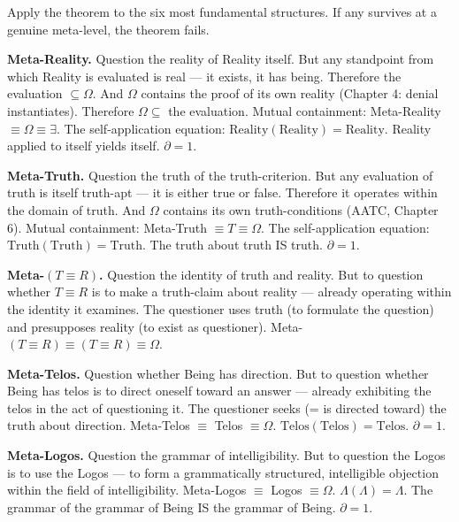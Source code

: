 \documentclass[10pt, openany, oneside]{book}
\begin{document}
\vspace{1em}

\noindent Apply the theorem to the six most fundamental structures. If any survives at a genuine meta-level, the theorem fails.

\textbf{Meta-Reality.} Question the reality of Reality itself. But any standpoint from which Reality is evaluated is real --- it exists, it has being. Therefore the evaluation $\subseteq \Omega$. And $\Omega$ contains the proof of its own reality (Chapter 4: denial instantiates). Therefore $\Omega \subseteq$ the evaluation. Mutual containment: Meta-Reality $\equiv \Omega \equiv \exists$. The self-application equation: $\text{Reality}(\text{Reality}) = \text{Reality}$. Reality applied to itself yields itself. $\partial = 1$.

\textbf{Meta-Truth.} Question the truth of the truth-criterion. But any evaluation of truth is itself truth-apt --- it is either true or false. Therefore it operates within the domain of truth. And $\Omega$ contains its own truth-conditions (AATC, Chapter 6). Mutual containment: Meta-Truth $\equiv T \equiv \Omega$. The self-application equation: $\text{Truth}(\text{Truth}) = \text{Truth}$. The truth about truth IS truth. $\partial = 1$.

\textbf{Meta-$(T \equiv R)$.} Question the identity of truth and reality. But to question whether $T \equiv R$ is to make a truth-claim about reality --- already operating within the identity it examines. The questioner uses truth (to formulate the question) and presupposes reality (to exist as questioner). Meta-$(T \equiv R) \equiv (T \equiv R) \equiv \Omega$.

\textbf{Meta-Telos.} Question whether Being has direction. But to question whether Being has telos is to direct oneself toward an answer --- already exhibiting the telos in the act of questioning it. The questioner seeks (= is directed toward) the truth about direction. Meta-Telos $\equiv$ Telos $\equiv \Omega$. $\text{Telos}(\text{Telos}) = \text{Telos}$. $\partial = 1$.

\textbf{Meta-Logos.} Question the grammar of intelligibility. But to question the Logos is to use the Logos --- to form a grammatically structured, intelligible objection within the field of intelligibility. Meta-Logos $\equiv$ Logos $\equiv \Omega$. $\Lambda(\Lambda) = \Lambda$. The grammar of the grammar of Being IS the grammar of Being. $\partial = 1$.
\end{document}
